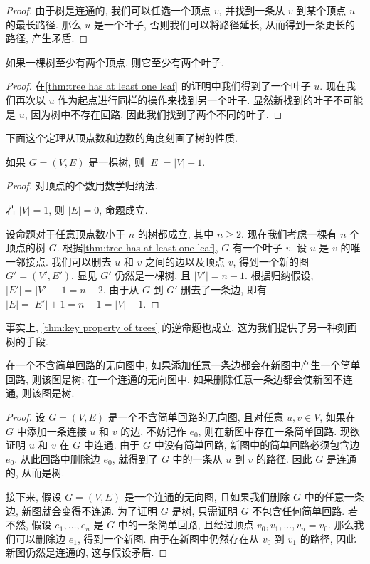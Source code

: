 \begin{proof}
    由于树是连通的, 我们可以任选一个顶点 $v$, 并找到一条从 $v$ 到某个顶点 $u$ 的最长路径. 那么 $u$ 是一个叶子, 否则我们可以将路径延长, 从而得到一条更长的路径, 产生矛盾. 
\end{proof}

\begin{corollary}
    如果一棵树至少有两个顶点, 则它至少有两个叶子.
\end{corollary}

\begin{proof}
    在\cref{thm:tree has at least one leaf} 的证明中我们得到了一个叶子 $u$. 现在我们再次以 $u$ 作为起点进行同样的操作来找到另一个叶子. 显然新找到的叶子不可能是 $u$, 因为树中不存在回路. 因此我们找到了两个不同的叶子.
\end{proof}

下面这个定理从顶点数和边数的角度刻画了树的性质.

\begin{theorem}
    如果 $G=(V,E)$ 是一棵树, 则 $|E|=|V|-1$.
\end{theorem}

\begin{proof}
    对顶点的个数用数学归纳法. 

    若 $|V|=1$, 则 $|E|=0$, 命题成立.

    设命题对于任意顶点数小于 $n$ 的树都成立, 其中 $n\geq 2$. 现在我们考虑一棵有 $n$ 个顶点的树 $G$. 根据\cref{thm:tree has at least one leaf}, $G$ 有一个叶子 $v$. 设 $u$ 是 $v$ 的唯一邻接点. 我们可以删去 $u$ 和 $v$ 之间的边以及顶点 $v$, 得到一个新的图 $G'=(V',E')$. 显见 $G'$ 仍然是一棵树, 且 $|V'|=n-1$. 根据归纳假设, $|E'|=|V'|-1=n-2$. 由于从 $G$ 到 $G'$ 删去了一条边, 即有 $|E|=|E'|+1=n-1=|V|-1$.
\end{proof}

事实上, \cref{thm:key property of trees} 的逆命题也成立, 这为我们提供了另一种刻画树的手段. 

\begin{theorem}
    在一个不含简单回路的无向图中, 如果添加任意一条边都会在新图中产生一个简单回路, 则该图是树; 在一个连通的无向图中, 如果删除任意一条边都会使新图不连通, 则该图是树.
\end{theorem}

\begin{proof}
    设 $G=(V,E)$ 是一个不含简单回路的无向图, 且对任意 $u,v\in V$, 如果在 $G$ 中添加一条连接 $u$ 和 $v$ 的边, 不妨记作 $e_0$, 则在新图中存在一条简单回路. 现欲证明 $u$ 和 $v$ 在 $G$ 中连通. 由于 $G$ 中没有简单回路, 新图中的简单回路必须包含边 $e_0$. 从此回路中删除边 $e_0$, 就得到了 $G$ 中的一条从 $u$ 到 $v$ 的路径. 因此 $G$ 是连通的, 从而是树.

    接下来, 假设 $G=(V,E)$ 是一个连通的无向图, 且如果我们删除 $G$ 中的任意一条边, 新图就会变得不连通. 为了证明 $G$ 是树, 只需证明 $G$ 不包含任何简单回路. 若不然, 假设 $e_1,\dots,e_n$ 是 $G$ 中的一条简单回路, 且经过顶点 $v_0,v_1,\dots,v_n=v_0$. 那么我们可以删除边 $e_1$, 得到一个新图. 由于在新图中仍然存在从 $v_0$ 到 $v_1$ 的路径, 因此新图仍然是连通的, 这与假设矛盾. 
\end{proof}

